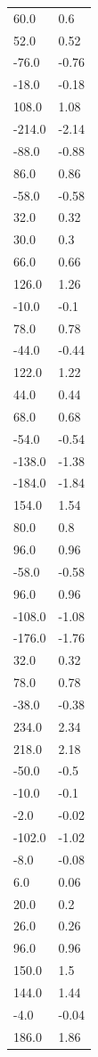 \begin{longtable}{ll}
60.0 & 0.6 \\
52.0 & 0.52 \\
-76.0 & -0.76 \\
-18.0 & -0.18 \\
108.0 & 1.08 \\
-214.0 & -2.14 \\
-88.0 & -0.88 \\
86.0 & 0.86 \\
-58.0 & -0.58 \\
32.0 & 0.32 \\
30.0 & 0.3 \\
66.0 & 0.66 \\
126.0 & 1.26 \\
-10.0 & -0.1 \\
78.0 & 0.78 \\
-44.0 & -0.44 \\
122.0 & 1.22 \\
44.0 & 0.44 \\
68.0 & 0.68 \\
-54.0 & -0.54 \\
-138.0 & -1.38 \\
-184.0 & -1.84 \\
154.0 & 1.54 \\
80.0 & 0.8 \\
96.0 & 0.96 \\
-58.0 & -0.58 \\
96.0 & 0.96 \\
-108.0 & -1.08 \\
-176.0 & -1.76 \\
32.0 & 0.32 \\
78.0 & 0.78 \\
-38.0 & -0.38 \\
234.0 & 2.34 \\
218.0 & 2.18 \\
-50.0 & -0.5 \\
-10.0 & -0.1 \\
-2.0 & -0.02 \\
-102.0 & -1.02 \\
-8.0 & -0.08 \\
6.0 & 0.06 \\
20.0 & 0.2 \\
26.0 & 0.26 \\
96.0 & 0.96 \\
150.0 & 1.5 \\
144.0 & 1.44 \\
-4.0 & -0.04 \\
186.0 & 1.86 \\

\end{longtable}
